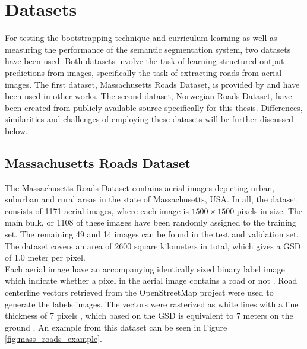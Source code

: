 \section{Datasets}
\label{sec:datasets}
For testing the bootstrapping technique and curriculum learning as well as measuring the performance of the semantic segmentation system, two datasets have been used. Both datasets involve the task of learning structured output predictions from images, specifically the task of extracting roads from aerial images. The first dataset, Massachusetts Roads Dataset, is provided by \cite{MnihThesis} and have been used in other works. The second dataset, Norwegian Roads Dataset, have been created from publicly available source specifically for this thesis. Differences, similarities and challenges of employing these datasets will be further discussed below.\\

\subsection{Massachusetts Roads Dataset}
The Massachusetts Roads Dataset contains aerial images depicting urban, suburban and rural areas in the state of Massachusetts, USA. In all, the dataset consists of 1171 aerial images, where each image is $1500\times 1500$ pixels in size. The main bulk, or 1108 of these images have been randomly assigned to the training set. The remaining 49 and 14 images can be found in the test and validation set. The dataset covers an area of 2600 square kilometers in total, which gives a \ac{GSD} of 1.0 meter per pixel.\\

Each aerial image have an accompanying identically sized binary label image which indicate whether a pixel in the aerial image contains a road or not . Road centerline vectors retrieved from the OpenStreetMap project were used to generate the labels images. The vectors were rasterized as white lines with a line thickness of 7 pixels \citep{MnihThesis}, which based on the \ac{GSD} is equivalent to 7 meters on the ground . An example from this dataset can be seen in Figure \ref{fig:mass_roads_example}.\\

